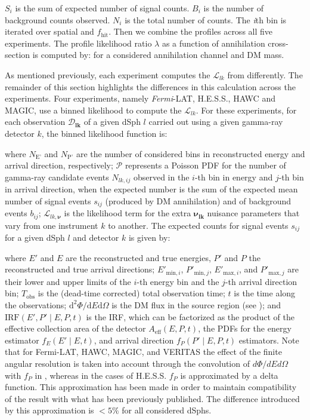 $S_i$ is the sum of expected number of signal counts.
$B_i$ is the number of background counts observed.
$N_i$ is the total number of counts.
The \textit{i}th bin is iterated over spatial and $f_{\textrm{hit}}$.
Then we combine the profiles across all five experiments.
The profile likelihood ratio $\lambda$ as a function of annihilation cross-section \sv is computed by:
\gdLLHratio
for a considered annihilation channel and DM mass.

As mentioned previously, each experiment computes the $\mathcal{L}_{lk}$ from  differently.
The remainder of this section highlights the differences in this calculation across the experiments.
Four experiments, namely \textit{Fermi}-LAT, H.E.S.S., HAWC and MAGIC, use a binned likelihood to compute the $\mathcal{L}_{lk}$.
For these experiments, for each observation $\bm{\mathcal{D}_{lk}}$ of a given dSph $l$ carried out using a given gamma-ray detector $k$, the binned likelihood function is:
\gdJointLLH

where $N_{\text{E'}}$ and $N_{\text{P'}}$ are the number of considered bins in reconstructed energy and arrival direction, respectively; $\mathcal{P}$ represents a Poisson PDF for the number of gamma-ray candidate events $ N_{lk,ij} $ observed in the $i$-th bin in energy and $j$-th bin in arrival direction, when the expected number is the sum of the expected mean number of signal events $ s_{ij} $ (produced by DM annihilation) and of background events $ b_{ij} $; $ \mathcal{L}_{lk,\bm{\nu}} $ is the likelihood term for the extra $ \bm{\nu_{lk}} $ nuisance parameters that vary from one instrument $k$ to another.
The expected counts for signal events $s_{ij}$ for a given dSph $l$ and detector $k$ is given by:

\gdExpectedNS

where $ E' $ and $ E $ are the reconstructed and true energies, $ P' $ and $ P $ the reconstructed and true arrival directions; $ E'_{\text{min},i} $, $ P'_{\text{min},j} $, $ E'_{\text{max},i} $, and $ P'_{\text{max},j} $ are their lower and upper limits of the $ i $-th energy bin and the $ j $-th arrival direction bin; $ T_{\text{obs}} $ is the (dead-time corrected) total observation time; $ t $ is the time along the observations; $ \text{d}^{2}\Phi/\text{d}E\text{d}\Omega $ is the DM flux in the source region (see );
and $ \text{IRF} \left( E', P' \mid E, P, t \right) $ is the IRF, which can be factorized as the product of the effective collection area of the detector $ A_{\mathrm{eff}} (E, P, t) $, the PDFs for the energy estimator $ f_{E} (E' \mid E,t) $, and arrival direction $ f_{P} (P' \mid E,P,t) $ estimators.
Note that for Fermi-LAT, HAWC, MAGIC, and VERITAS the effect of the finite angular resolution is taken into account through the convolution of $d\Phi/dE d\Omega$ with $f_{P}$ in , whereas in the cases of H.E.S.S. $f_{P}$ is approximated by a delta function.
This approximation has been made in order to maintain compatibility of the result with what has been previously published.
The difference introduced by this approximation is $<5\%$ for all considered dSphs.

